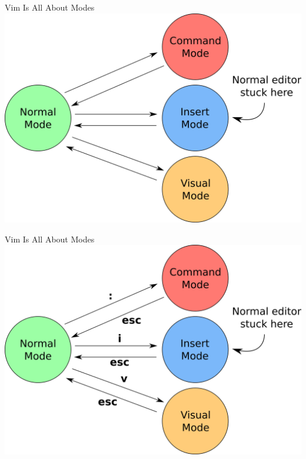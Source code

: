 \documentclass{beamer}
\begin{document}
\begin{frame}{Vim Is All About Modes}
    \includegraphics[width=1\textwidth]{images/vim-modes.png}
\end{frame}

\begin{frame}{Vim Is All About Modes}
    \includegraphics[width=1\textwidth]{images/vim-modes-keys.png}
\end{frame}
\end{document}
